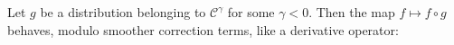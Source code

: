 \documentclass[a4paper,11pt]{article}
\newcommand{\mathd}{\mathrm{d}}
\theoremstyle{remark}
\newcommand{\CA}{\ensuremath{\mathscr{A}}}
\newcommand{\CC}{\ensuremath{\mathscr{C}}}
\newcommand{\CF}{\ensuremath{\mathscr{F}}}
\newcommand{\lpara}{\,\mathord{\prec}\,}
\newcommand{\reso}{\,\mathord{\circ}\,}
\begin{document}
   

Let $g$ be a distribution belonging to $\CC^{\gamma}$ for some $\gamma <0$. Then
the map $f \mapsto f \reso g$ behaves, modulo smoother correction terms, like
a derivative operator:
\end{document}
